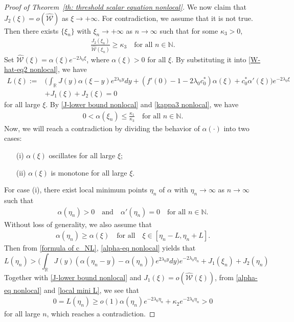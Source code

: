 \documentclass[11pt,a4paper]{article}
\numberwithin{equation}{section}
\numberwithin{figure}{section}
\newcommand\bea{\begin{eqnarray}}
\newcommand\eea{\end{eqnarray}}
\newcommand\beaa{\begin{eqnarray*}}
\newcommand\eeaa{\end{eqnarray*}}
\begin{document}
\begin{proof}[Proof of Theorem~\ref{th: threshold scalar equation nonlocal}]
We now claim that $J_2(\xi)=o(\widehat{\mathcal{W}})$ as $\xi\to+\infty$.
For contradiction, we assume that it is not true. Then there exists $\{\xi_n\}$ with
$\xi_n\to+\infty$ as $n\to\infty$ such that for some $\kappa_3>0$,
\bea\label{kappa3 nonlocal}
\frac{J_2(\xi_n)}{\widehat{\mathcal{W}}(\xi_n)}\geq \kappa_3\quad \mbox{for all $n\in\mathbb{N}$.}
\eea
Set $\widehat{\mathcal{W}}(\xi)=\alpha(\xi)e^{-2\lambda_0\xi}$, where $\alpha(\xi)>0$ for all $\xi$.
By substituting it into \eqref{W-hat-eq2 nonlocal},
we have 
\begin{equation}\label{alpha-eq nonlocal}
\begin{aligned}
L(\xi):=&\Big(\int_{\mathbb{R}}J(y)\alpha(\xi-y)e^{2\lambda_0y}dy+(f'(0)-1-2\lambda_0c^*_0)\alpha(\xi)+ c^*_0\alpha'(\xi)\Big)e^{-2\lambda_0\xi}\\
&+J_1(\xi)+J_2(\xi)=0
\end{aligned}
\end{equation}
for all large $\xi$.
By \eqref{J-lower bound nonlocal} and \eqref{kappa3 nonlocal}, we have 
\bea\label{alpha-bdd nonlocal}
0<\alpha(\xi_n)\leq \frac{\kappa_1}{\kappa_3}\quad  \mbox{for all $n\in\mathbb{N}$.}
\eea
Now, we will reach a contradiction by dividing the behavior of $\alpha(\cdot)$ into two cases:
\begin{itemize}
    \item[(i)] $\alpha(\xi)$ oscillates for all large $\xi$;
    \item[(ii)] $\alpha(\xi)$ is monotone for all large $\xi$.
\end{itemize}

For case (i), there exist local minimum points $\eta_n$ of $\alpha$ with $\eta_n\to\infty$ as $n\to\infty$ such that
\beaa
\alpha(\eta_n)>0\quad\text{and}\quad \alpha'(\eta_n)=0\quad  \mbox{for all $n\in\mathbb{N}$.}
\eeaa
Without loss of generality, we also assume that 
\bea\label{local mini L}
\alpha(\eta_n)\ge\alpha(\xi)\quad\text{for all}\quad \xi\in[\eta_n-L,\eta_n+L].
\eea
Then from \eqref{formula of c_NL},  \eqref{alpha-eq nonlocal} yields that
\begin{equation*}%
L(\eta_n)>\Big(\int_{\mathbb{R}}J(y)(\alpha(\eta_n-y)-\alpha(\eta_n))e^{2\lambda_0y}dy\Big)e^{-2\lambda_0\eta_n}+J_1(\xi_n)+J_2(\eta_n)
\end{equation*}
Together with \eqref{J-lower bound nonlocal} and $J_1(\xi)=o(\widehat{\mathcal{W}}(\xi))$,
from \eqref{alpha-eq nonlocal} and \eqref{local mini L}, we see that
\beaa
0=L(\eta_n)\geq o(1)\alpha(\eta_n)e^{-2\lambda_0\eta_n}+\kappa_2e^{-2\lambda_0\eta_n}>0
\eeaa
for all large $n$, which reaches a contradiction. 


\end{proof}
\end{document}

